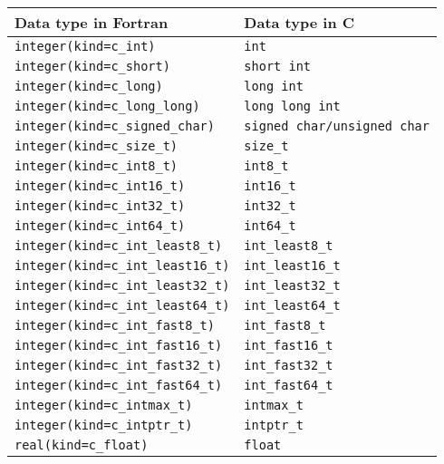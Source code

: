 \documentclass[12pt,a4paper,dvipdfmx]{book} %
\begin{document}
\begin{table}[H]
\begin{tabularx}{\linewidth}{XX}
\toprule
\rowcolor{Snow2}
Data type in Fortran & Data type in C \\
\midrule
\texttt{integer(kind=c\_int)}                   & \texttt{int}\\
\texttt{integer(kind=c\_short)}                 & \texttt{short int}\\
\texttt{integer(kind=c\_long)}                  & \texttt{long int}\\
\texttt{integer(kind=c\_long\_long)}            & \texttt{long long int}\\
\texttt{integer(kind=c\_signed\_char)}          & \texttt{signed char/unsigned char}\\
\texttt{integer(kind=c\_size\_t)}               & \texttt{size\_t}\\
\texttt{integer(kind=c\_int8\_t)}               & \texttt{int8\_t}\\
\texttt{integer(kind=c\_int16\_t)}              & \texttt{int16\_t}\\
\texttt{integer(kind=c\_int32\_t)}              & \texttt{int32\_t}\\
\texttt{integer(kind=c\_int64\_t)}              & \texttt{int64\_t}\\
\texttt{integer(kind=c\_int\_least8\_t)}        & \texttt{int\_least8\_t}\\
\texttt{integer(kind=c\_int\_least16\_t)}       & \texttt{int\_least16\_t}\\
\texttt{integer(kind=c\_int\_least32\_t)}       & \texttt{int\_least32\_t}\\
\texttt{integer(kind=c\_int\_least64\_t)}       & \texttt{int\_least64\_t}\\
\texttt{integer(kind=c\_int\_fast8\_t)}         & \texttt{int\_fast8\_t}\\
\texttt{integer(kind=c\_int\_fast16\_t)}        & \texttt{int\_fast16\_t}\\
\texttt{integer(kind=c\_int\_fast32\_t)}        & \texttt{int\_fast32\_t}\\
\texttt{integer(kind=c\_int\_fast64\_t)}        & \texttt{int\_fast64\_t}\\
\texttt{integer(kind=c\_intmax\_t)}             & \texttt{intmax\_t}\\
\texttt{integer(kind=c\_intptr\_t)}             & \texttt{intptr\_t}\\
\texttt{real(kind=c\_float)}                    & \texttt{float}\\

\end{tabularx}
\end{table}
\end{document}
